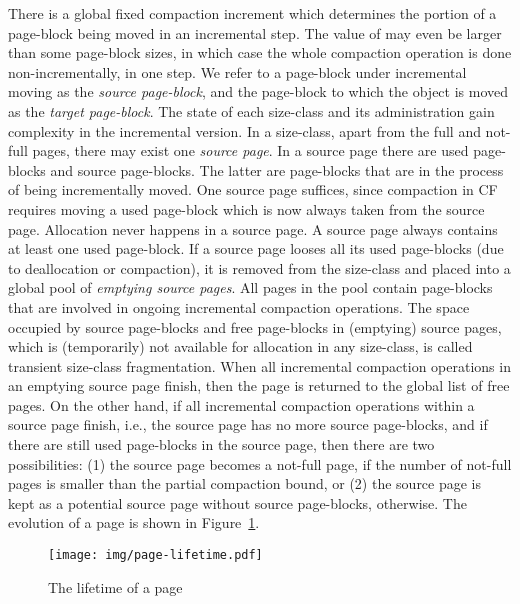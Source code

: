 \documentclass{amsart}
\begin{document}
There is a global fixed compaction increment  which
determines the portion of a page-block being moved in an incremental
step. The value of  may even be larger than some page-block
sizes, in which case the whole compaction operation is done
non-incrementally, in one step. We refer to a page-block under
incremental moving as the \emph{source page-block}, and the page-block
to which the object is moved as the \emph{target page-block}.  The
state of each size-class and its administration gain complexity in the
incremental version.  In a size-class, apart from the full and
not-full pages, there may exist one \emph{source page}. In a source
page there are used page-blocks and source page-blocks. The latter are
page-blocks that are in the process of being incrementally moved. One
source page suffices, since compaction in CF requires moving a used
page-block which is now always taken from the source page. Allocation
never happens in a source page. A source page always contains at least
one used page-block.  If a source page looses all its used page-blocks
(due to deallocation or compaction), it is removed from the size-class
and placed into a global pool  of \emph{emptying source pages}.
All pages in the pool contain page-blocks that are involved in ongoing
incremental compaction operations.  The space occupied by source
page-blocks and free page-blocks in (emptying) source pages, which is
(temporarily) not available for allocation in any size-class, is
called transient size-class fragmentation.  When all incremental
compaction operations in an emptying source page finish, then the page
is returned to the global list of free pages.  On the other hand, if
all incremental compaction operations within a source page finish,
i.e., the source page has no more source page-blocks, and if there are
still used page-blocks in the source page, then there are two
possibilities: (1) the source page becomes a not-full page, if the
number of not-full pages is smaller than the partial compaction bound,
or (2) the source page is kept as a potential source page without
source page-blocks, otherwise. The evolution of a page is shown in
Figure~\ref{fig:page-lifetime}.



\begin{figure}[ht!]
    \begin{center}
        \texttt{[image: img/page-lifetime.pdf]}
        \caption{The lifetime of a page}
        \label{fig:page-lifetime}
    \end{center}
\end{figure}
\end{document}
